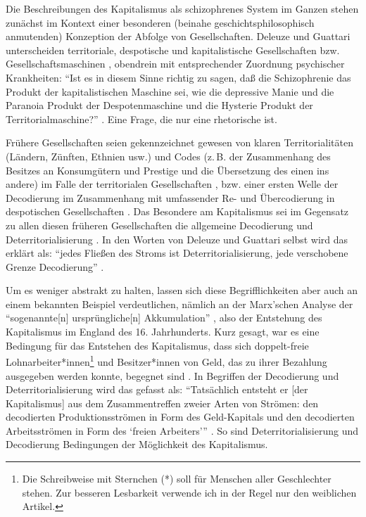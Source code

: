 \documentclass[12pt,
               paper=a4,
               twoside=false,
               onehalfspacing,
               bibliography=totoc,
               toc=graduated,
               ]{scrartcl}
\newcommand{\pc}[2]{\parencite[#1]{#2}}
\newcommand{\vgl}[2]{\parencite[vgl.][#1]{#2}}
\newcommand{\dg}{Deleuze und Guattari\xspace}
\begin{document}
Die Beschreibungen des Kapitalismus als schizophrenes System im
Ganzen stehen zunächst im Kontext einer besonderen (beinahe
geschichtsphilosophisch anmutenden) Konzeption der Abfolge von
Gesellschaften. Deleuze und Guattari unterscheiden territoriale,
despotische und kapitalistische Gesellschaften bzw.
Gesellschaftsmaschinen \vgl{338}{ao}, obendrein mit entsprechender
Zuordnung psychischer Krankheiten: "`Ist es in diesem Sinne richtig zu
sagen, daß die Schizophrenie das Produkt der kapitalistischen Maschine
sei, wie die depressive Manie und die Paranoia Produkt der
Despotenmaschine und die Hysterie Produkt der Territorialmaschine?"'
\pc{44}{ao}. Eine Frage, die nur eine rhetorische ist.

Frühere Gesellschaften seien gekennzeichnet gewesen von klaren
Territorialitäten (Ländern, Zünften, Ethnien usw.) und Codes (z.\,B.
der Zusammenhang des Besitzes an Konsumgütern und Prestige und die
Übersetzung des einen ins andere) im Falle der territorialen
Gesellschaften \vgl{318, 332}{ao}, bzw. einer ersten Welle der
Decodierung im Zusammenhang mit umfassender Re- und Übercodierung in
despotischen Gesellschaften \vgl{337}{ao}. Das Besondere am
Kapitalismus sei im Gegensatz zu allen diesen früheren Gesellschaften
die allgemeine Decodierung und Deterritorialisierung \vgl{337}{ao}. In
den Worten von \dg selbst wird das erklärt als: "`jedes Fließen des
Stroms ist Deterritorialisierung, jede verschobene Grenze
Decodierung"' \pc{298}{ao}.

Um es weniger abstrakt zu halten, lassen sich diese Begrifflichkeiten
aber auch an einem bekannten Beispiel verdeutlichen, nämlich an der
Marx'schen Analyse der "`sogenannte[n] ursprüngliche[n] Akkumulation"'
\pc{741}{kap}, also der Entstehung des Kapitalismus im England des 16.
Jahrhunderts. Kurz gesagt, war es eine Bedingung für das Entstehen des
Kapitalismus, dass sich doppelt-freie Lohnarbeiter*innen\footnote{Die
Schreibweise mit Sternchen (*) soll für Menschen aller Geschlechter
stehen. Zur besseren Lesbarkeit verwende ich in der Regel nur den
weiblichen Artikel.} und Besitzer*innen von Geld, das zu ihrer
Bezahlung ausgegeben werden konnte, begegnet sind \vgl{742}{kap}. In
Begriffen der Decodierung und Deterritorialisierung wird das gefasst
als: \enquote{Tatsächlich entsteht er [der Kapitalismus] aus dem
Zusammentreffen zweier Arten von Strömen: den decodierten
Produktionsströmen in Form des Geld-Kapitals und den decodierten
Arbeitsströmen in Form des \enquote{freien Arbeiters}} \pc{44}{ao}. So
sind Deterritorialisierung und Decodierung Bedingungen der Möglichkeit
des Kapitalismus.
\end{document}
